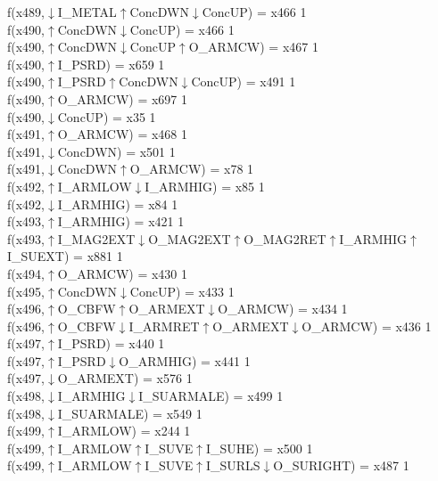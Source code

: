 f(x489,$\downarrow$I\_METAL$\uparrow$ConcDWN$\downarrow$ConcUP) = x466 {1} \\
f(x490,$\uparrow$ConcDWN$\downarrow$ConcUP) = x466 {1} \\
f(x490,$\uparrow$ConcDWN$\downarrow$ConcUP$\uparrow$O\_ARMCW) = x467 {1} \\
f(x490,$\uparrow$I\_PSRD) = x659 {1} \\
f(x490,$\uparrow$I\_PSRD$\uparrow$ConcDWN$\downarrow$ConcUP) = x491 {1} \\
f(x490,$\uparrow$O\_ARMCW) = x697 {1} \\
f(x490,$\downarrow$ConcUP) = x35 {1} \\
f(x491,$\uparrow$O\_ARMCW) = x468 {1} \\
f(x491,$\downarrow$ConcDWN) = x501 {1} \\
f(x491,$\downarrow$ConcDWN$\uparrow$O\_ARMCW) = x78 {1} \\
f(x492,$\uparrow$I\_ARMLOW$\downarrow$I\_ARMHIG) = x85 {1} \\
f(x492,$\downarrow$I\_ARMHIG) = x84 {1} \\
f(x493,$\uparrow$I\_ARMHIG) = x421 {1} \\
f(x493,$\uparrow$I\_MAG2EXT$\downarrow$O\_MAG2EXT$\uparrow$O\_MAG2RET$\uparrow$I\_ARMHIG$\uparrow$I\_SUEXT) = x881 {1} \\
f(x494,$\uparrow$O\_ARMCW) = x430 {1} \\
f(x495,$\uparrow$ConcDWN$\downarrow$ConcUP) = x433 {1} \\
f(x496,$\uparrow$O\_CBFW$\uparrow$O\_ARMEXT$\downarrow$O\_ARMCW) = x434 {1} \\
f(x496,$\uparrow$O\_CBFW$\downarrow$I\_ARMRET$\uparrow$O\_ARMEXT$\downarrow$O\_ARMCW) = x436 {1} \\
f(x497,$\uparrow$I\_PSRD) = x440 {1} \\
f(x497,$\uparrow$I\_PSRD$\downarrow$O\_ARMHIG) = x441 {1} \\
f(x497,$\downarrow$O\_ARMEXT) = x576 {1} \\
f(x498,$\downarrow$I\_ARMHIG$\downarrow$I\_SUARMALE) = x499 {1} \\
f(x498,$\downarrow$I\_SUARMALE) = x549 {1} \\
f(x499,$\uparrow$I\_ARMLOW) = x244 {1} \\
f(x499,$\uparrow$I\_ARMLOW$\uparrow$I\_SUVE$\uparrow$I\_SUHE) = x500 {1} \\
f(x499,$\uparrow$I\_ARMLOW$\uparrow$I\_SUVE$\uparrow$I\_SURLS$\downarrow$O\_SURIGHT) = x487 {1} \\
